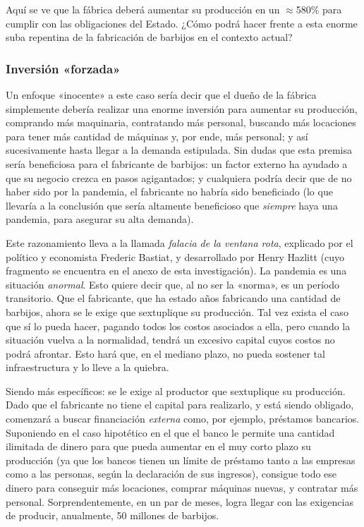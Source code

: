 \documentclass[12pt,a4paper,twoside]{book}
\begin{document}
Aquí se ve que la fábrica deberá aumentar su producción en un $ \approx $580\% para cumplir con las obligaciones del Estado. ¿Cómo podrá hacer frente a esta enorme suba repentina de la fabricación de barbijos en el contexto actual?

\subsubsection{Inversión «forzada»}
Un enfoque «inocente» a este caso sería decir que el dueño de la fábrica simplemente debería realizar una enorme inversión para aumentar su producción, comprando más maquinaria, contratando más personal, buscando más locaciones para tener más cantidad de máquinas y, por ende, más personal; y así sucesivamente hasta llegar a la demanda estipulada. Sin dudas que esta premisa sería beneficiosa para el fabricante de barbijos: un factor externo ha ayudado a que su negocio crezca en pasos agigantados; y cualquiera podría decir que de no haber sido por la pandemia, el fabricante no habría sido beneficiado (lo que llevaría a la conclusión que sería altamente beneficioso que \textit{siempre} haya una pandemia, para asegurar su alta demanda).

Este razonamiento lleva a la llamada \textit{falacia de la ventana rota}, explicado por el político y economista Frederic Bastiat, y desarrollado por Henry Hazlitt (cuyo fragmento se encuentra en el anexo de esta investigación). La pandemia es una situación \textit{anormal}. Esto quiere decir que, al no ser la «norma», es un período transitorio. Que el fabricante, que ha estado años fabricando una cantidad de barbijos, ahora se le exige que sextuplique su producción. Tal vez exista el caso que sí lo pueda hacer, pagando todos los costos asociados a ella, pero cuando la situación vuelva a la normalidad, tendrá un excesivo capital cuyos costos no podrá afrontar. Esto hará que, en el mediano plazo, no pueda sostener tal infraestructura y lo lleve a la quiebra.

Siendo más específicos: se le exige al productor que sextuplique su producción. Dado que el fabricante no tiene el capital para realizarlo, y está siendo obligado, comenzará a buscar financiación \textit{externa} como, por ejemplo, préstamos bancarios. Suponiendo en el caso hipotético en el que el banco le permite una cantidad ilimitada de dinero para que pueda aumentar en el muy corto plazo su producción (ya que los bancos tienen un límite de préstamo tanto a las empresas como a las personas, según la declaración de sus ingresos), consigue todo ese dinero para conseguir más locaciones, comprar máquinas nuevas, y contratar más personal. Sorprendentemente, en un par de meses, logra llegar con las exigencias de producir, anualmente, 50 millones de barbijos.
\end{document}
